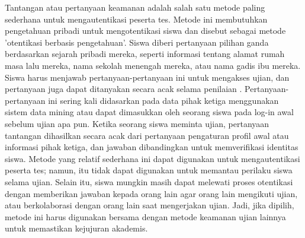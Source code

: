 Tantangan atau pertanyaan keamanan adalah salah satu metode paling sederhana untuk mengautentikasi peserta tes. Metode ini membutuhkan pengetahuan pribadi untuk mengotentikasi siswa dan disebut sebagai metode 'otentikasi berbasis pengetahuan'. Siswa diberi pertanyaan pilihan ganda berdasarkan sejarah pribadi mereka, seperti informasi tentang alamat rumah masa lalu mereka, nama sekolah menengah mereka, atau nama gadis ibu mereka. Siswa harus menjawab pertanyaan-pertanyaan ini untuk mengakses ujian, dan pertanyaan juga dapat ditanyakan secara acak selama penilaian . Pertanyaan-pertanyaan ini sering kali didasarkan pada data pihak ketiga menggunakan sistem data mining atau dapat dimasukkan oleh seorang siswa pada log-in awal sebelum ujian apa pun. Ketika seorang siswa meminta ujian, pertanyaan tantangan dihasilkan secara acak dari pertanyaan pengaturan profil awal atau informasi pihak ketiga, dan jawaban dibandingkan untuk memverifikasi identitas siswa. Metode yang relatif sederhana ini dapat digunakan untuk mengautentikasi peserta tes; namun, itu tidak dapat digunakan untuk memantau perilaku siswa selama ujian. Selain itu, siswa mungkin masih dapat melewati proses otentikasi dengan memberikan jawaban kepada orang lain agar orang lain mengikuti ujian, atau berkolaborasi dengan orang lain saat mengerjakan ujian. Jadi, jika dipilih, metode ini harus digunakan bersama dengan metode keamanan ujian lainnya untuk memastikan kejujuran akademis.
